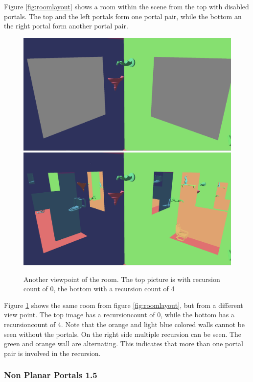 Figure \ref{fig:roomlayout} shows a room within the scene from the top with disabled portals. The top and the left portals form one portal pair, while the bottom an the right portal form another portal pair.

\begin{figure}[H]
	\includegraphics[width=\linewidth]{images/roomportalsr0.png}
	\includegraphics[width=\linewidth]{images/roomportals.png}
	\caption{Another viewpoint of the room.  The top picture is with recursion count of 0, the bottom with a recursion count of 4}
	\label{fig:room}
\end{figure}


Figure \ref{fig:room} shows the same room from figure \ref{fig:roomlayout}, but from a different view point. The top image has a \gls{recursioncount} of 0, while the bottom has a \gls{recursioncount} of 4. Note that the orange and light blue colored walls cannot be seen without the portals. On the right side multiple recursion can be seen. The green and orange wall are alternating. This indicates that more than one portal pair is involved in the recursion.

\subsubsection{Non Planar Portals 1.5}
\label{section:nonplanar}

